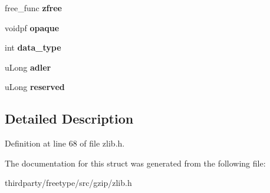 \begin{DoxyCompactItemize}
\mbox{\label{structz__stream__s_a89eb750ade7f4f0b56bfdadf13344982}} 
free\+\_\+func {\bfseries zfree}
\item 
\mbox{\label{structz__stream__s_ab72467f908d2ce65d5b42ee6556ef8bb}} 
voidpf {\bfseries opaque}
\item 
\mbox{\label{structz__stream__s_a9d8f63877d7639a8bca60f9fc3704fc4}} 
int {\bfseries data\+\_\+type}
\item 
\mbox{\label{structz__stream__s_ade2217fe31e671be1257731883201223}} 
u\+Long {\bfseries adler}
\item 
\mbox{\label{structz__stream__s_add73791dd19b49c9c68f3f3d328c37db}} 
u\+Long {\bfseries reserved}
\end{DoxyCompactItemize}


\subsection{Detailed Description}


Definition at line 68 of file zlib.\+h.



The documentation for this struct was generated from the following file\+:\begin{DoxyCompactItemize}
\item 
thirdparty/freetype/src/gzip/zlib.\+h\end{DoxyCompactItemize}
